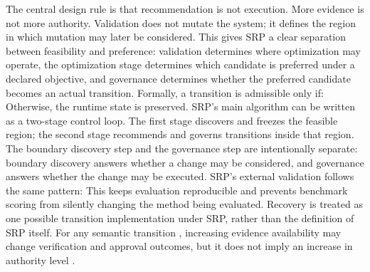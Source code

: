 {}The central design rule is that recommendation is not execution. More evidence is not more authority. Validation does not mutate the system; it defines the region in which mutation may later be considered.\markdownRendererParagraphSeparator
{}This gives SRP a clear separation between feasibility and preference: validation determines where optimization may operate, the optimization stage determines which candidate is preferred under a declared objective, and governance determines whether the preferred candidate becomes an actual transition.\markdownRendererParagraphSeparator
{}Formally, a transition is admissible only if:\markdownRendererInterblockSeparator
{}\markdownRendererInterblockSeparator
{}Otherwise, the runtime state is preserved.\markdownRendererInterblockSeparator
{}
\markdownRendererSectionEnd \markdownRendererSectionBegin
{}\markdownRendererInterblockSeparator
{}SRP's main algorithm can be written as a two-stage control loop. The first stage discovers and freezes the feasible region; the second stage recommends and governs transitions inside that region.\markdownRendererInterblockSeparator
{}\markdownRendererInterblockSeparator
{}The boundary discovery step and the governance step are intentionally separate: boundary discovery answers whether a change may be considered, and governance answers whether the change may be executed.\markdownRendererParagraphSeparator
{}SRP's external validation follows the same pattern:\markdownRendererInterblockSeparator
{}\markdownRendererInterblockSeparator
{}This keeps evaluation reproducible and prevents benchmark scoring from silently changing the method being evaluated.\markdownRendererSoftLineBreak
{}Recovery is treated as one possible transition implementation under SRP, rather than the definition of SRP itself.\markdownRendererInterblockSeparator
{}
\markdownRendererSectionEnd \markdownRendererSectionBegin
{}\markdownRendererInterblockSeparator
{}For any semantic transition , increasing evidence availability  may change verification and approval outcomes, but it does not imply an increase in authority level .\markdownRendererParagraphSeparator
